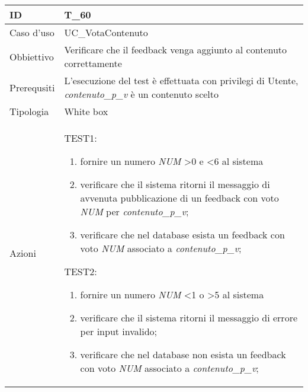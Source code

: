 \begin{table}[hb]
    \centering
    \begin{tabular}{ |p{2cm}|p{10cm}|  }
        \hline
        ID          & T\_60                                                                              \\\hline
        Caso d'uso  & UC\_VotaContenuto                                                                  \\\hline
        Obbiettivo  & Verificare che il feedback venga aggiunto al contenuto correttamente               \\\hline
        Prerequsiti & L'esecuzione del test è effettuata con privilegi di Utente, \emph{contenuto\_p\_v}
        è un contenuto scelto                                                                            \\\hline
        Tipologia   & White box                                                                          \\\hline
        Azioni      &
        TEST1:
        \begin{enumerate}[nosep, topsep=0pt]
            \item fornire un numero \emph{NUM} \textgreater 0 e \textless 6 al sistema
            \item verificare che il sistema ritorni il messaggio di avvenuta pubblicazione
                  di un feedback con voto \emph{NUM} per \emph{contenuto\_p\_v};
            \item verificare che nel database esista un feedback con voto \emph{NUM} associato a
                  \emph{contenuto\_p\_v};
        \end{enumerate}
        \vspace{0.5cm} TEST2:
        \begin{enumerate}[nosep, topsep=0pt]
            \item fornire un numero \emph{NUM} \textless 1 o \textgreater 5 al sistema
            \item verificare che il sistema ritorni il messaggio di errore per input invalido;
            \item verificare che nel database non esista un feedback con voto \emph{NUM} associato a
                  \emph{contenuto\_p\_v};
        \end{enumerate}
        \\\hline
    \end{tabular}
\end{table}

